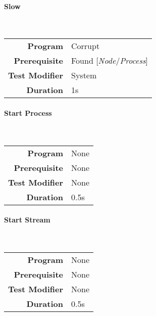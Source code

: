 \hfill

\paragraph{Slow}
\label{par: slow}

\mbox{}\\

\begin{tabular}{rl}
    \textbf{Program}       & Corrupt                            \\
    \textbf{Prerequisite}  & Found [\emph{Node}/\emph{Process}] \\
    \textbf{Test Modifier} & System                             \\
    \textbf{Duration}      & 1s                                 \\
\end{tabular}

\hfill

\paragraph{Start Process}
\label{par: start process}

\mbox{}\\

\begin{tabular}{rl}
    \textbf{Program}       & None \\
    \textbf{Prerequisite}  & None \\
    \textbf{Test Modifier} & None \\
    \textbf{Duration}      & 0.5s \\
\end{tabular}

\hfill

\paragraph{Start Stream}
\label{par: start stream}

\mbox{}\\

\begin{tabular}{rl}
    \textbf{Program}       & None \\
    \textbf{Prerequisite}  & None \\
    \textbf{Test Modifier} & None \\
    \textbf{Duration}      & 0.5s \\
\end{tabular}

